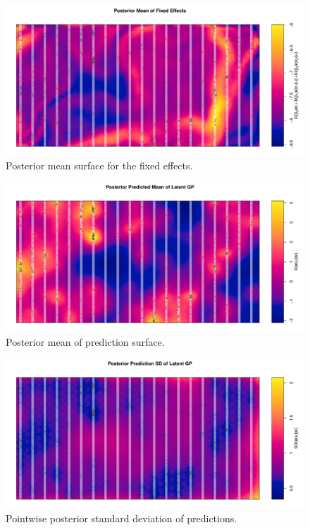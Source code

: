 \documentclass[]{interact}
\begin{document}
\begin{figure}[h]
\includegraphics[width=\textwidth]{figures/bei-effort_betas.pdf}
\caption{Posterior mean surface for the fixed effects.}
\label{effortbetas}
\end{figure}

\begin{figure}[h]
\includegraphics[width=\textwidth]{figures/bei-effort_mean.pdf}
\caption{Posterior mean of prediction surface.}
\label{effortmean}
\end{figure}

\begin{figure}[h]
\includegraphics[width=\textwidth]{figures/bei-effort_sd.pdf}
\caption{Pointwise posterior standard deviation of predictions.}
\label{effortsd}
\end{figure}
\end{document}
